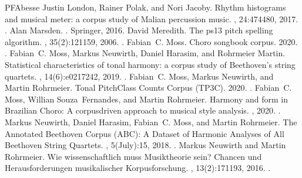 \documentclass[letterpaper,10pt,english]{sphinxmanual}
\begin{document}
\begin{sphinxthebibliography}{PFAbesse}
Justin London, Rainer Polak, and Nori Jacoby. Rhythm histograms and musical meter: a corpus study of Malian percussion music. , 24:474\textendash{}480, 2017. .
Alan Marsden. . Springer, 2016.
David Meredith. The ps13 pitch spelling algorithm. , 35(2):121\textendash{}159, 2006. .
Fabian C. Moss. Choro songbook corpus. 2020. .
Fabian C. Moss, Markus Neuwirth, Daniel Harasim, and Rohrmeier Martin. Statistical characteristics of tonal harmony: a corpus study of Beethoven’s string quartets. , 14(6):e0217242, 2019. .
Fabian C. Moss, Markus Neuwirth, and Martin Rohrmeier. Tonal Pitch\sphinxhyphen{}Class Counts Corpus (TP3C). 2020. .
Fabian C. Moss, Willian Souza Fernandes, and Martin Rohrmeier. Harmony and form in Brazilian Choro: A corpus\sphinxhyphen{}driven approach to musical style analysis. , 2020. .
Markus Neuwirth, Daniel Harasim, Fabian C. Moss, and Martin Rohrmeier. The Annotated Beethoven Corpus (ABC): A Dataset of Harmonic Analyses of All Beethoven String Quartets. , 5(July):1\textendash{}5, 2018. .
Markus Neuwirth and Martin Rohrmeier. Wie wissenschaftlich muss Musiktheorie sein? Chancen und Herausforderungen musikalischer Korpusforschung. , 13(2):171\textendash{}193, 2016. .

\end{sphinxthebibliography}
\end{document}

